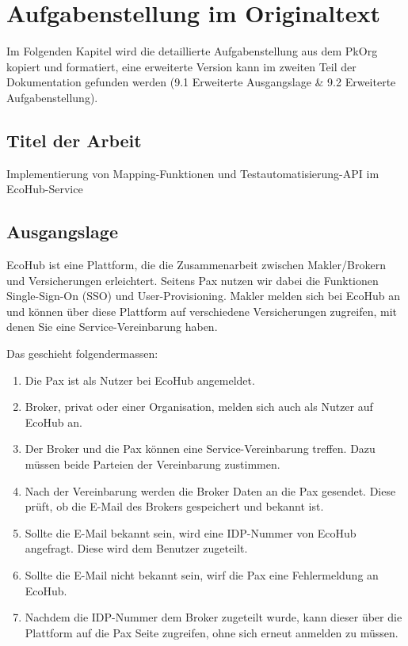 \chapter{Aufgabenstellung im Originaltext}
\vspace{-3em}
Im Folgenden Kapitel wird die detaillierte Aufgabenstellung aus dem PkOrg kopiert und formatiert, eine erweiterte Version kann im zweiten Teil der Dokumentation gefunden werden (9.1 Erweiterte Ausgangslage \& 9.2 Erweiterte Aufgabenstellung).

\section{Titel der Arbeit}
Implementierung von Mapping-Funktionen und Testautomatisierung-API im EcoHub-Service

\section{Ausgangslage}
EcoHub ist eine Plattform, die die Zusammenarbeit zwischen Makler/Brokern und Versicherungen erleichtert.
Seitens Pax nutzen wir dabei die Funktionen Single-Sign-On (SSO) und User-Provisioning. Makler melden sich
bei EcoHub an und können über diese Plattform auf verschiedene Versicherungen zugreifen, mit denen Sie eine
Service-Vereinbarung haben.

Das geschieht folgendermassen:

\begin{enumerate}
\item Die Pax ist als Nutzer bei EcoHub angemeldet.
\item Broker, privat oder einer Organisation, melden sich auch als Nutzer auf EcoHub an.
\item Der Broker und die Pax können eine Service-Vereinbarung treffen. Dazu müssen beide Parteien der Vereinbarung zustimmen.
\item Nach der Vereinbarung werden die Broker Daten an die Pax gesendet. Diese prüft, ob die E-Mail des Brokers gespeichert und bekannt ist.
\item Sollte die E-Mail bekannt sein, wird eine IDP-Nummer von EcoHub angefragt. Diese wird dem Benutzer zugeteilt.
\item Sollte die E-Mail nicht bekannt sein, wirf die Pax eine Fehlermeldung an EcoHub.
\item Nachdem die IDP-Nummer dem Broker zugeteilt wurde, kann dieser über die Plattform auf die Pax Seite zugreifen, ohne sich erneut anmelden zu müssen.
\end{enumerate}

